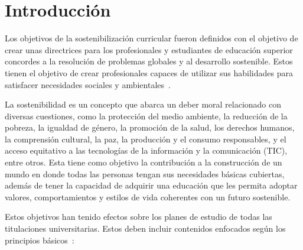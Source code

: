 
\section{Introducción}

Los objetivos de la sostenibilización curricular fueron definidos con el objetivo de crear unas directrices para los profesionales y estudiantes de educación superior concordes a la resolución de problemas globales y al desarrollo sostenible. Estos tienen el objetivo de crear profesionales capaces de utilizar sus habilidades para satisfacer necesidades sociales y ambientales~\cite{direcsost}.

La sostenibilidad es un concepto que abarca un deber moral relacionado con diversas cuestiones, como la protección del medio ambiente, la reducción de la pobreza, la igualdad de género, la promoción de la salud, los derechos humanos, la comprensión cultural, la paz, la producción y el consumo responsables, y el acceso equitativo a las tecnologías de la información y la comunicación (TIC), entre otros. Esta tiene como objetivo la contribución a la construcción de un mundo en donde todas las personas tengan sus necesidades básicas cubiertas, además de tener la capacidad de  adquirir una educación que les permita adoptar valores, comportamientos y estilos de vida coherentes con un futuro sostenible.

Estos objetivos han tenido efectos sobre los planes de estudio de todas las titulaciones universitarias. Estos deben incluir contenidos enfocados según los principios básicos~\cite{direcsost}:

